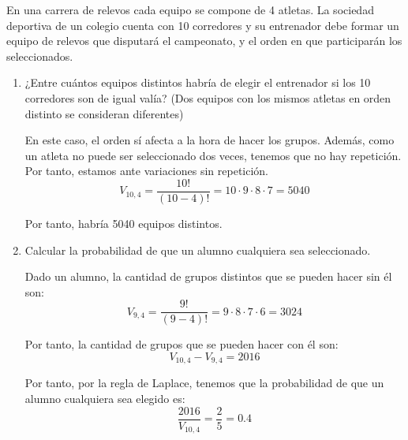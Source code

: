 \begin{ejercicio} \label{ej:3.Ejercicio8}
    En una carrera de relevos cada equipo se compone de 4 atletas. La sociedad deportiva de un colegio cuenta con 10 corredores y su entrenador debe formar un equipo de relevos que disputará el campeonato, y el orden en que participarán los seleccionados.
    \begin{enumerate}
        \item ¿Entre cuántos equipos distintos habría de elegir el entrenador si los 10 corredores son de igual valía? (Dos equipos con los mismos atletas en orden distinto se consideran diferentes)

        En este caso, el orden sí afecta a la hora de hacer los grupos. Además, como un atleta no puede ser seleccionado dos veces, tenemos que no hay repetición. Por tanto, estamos ante variaciones sin repetición.
        \begin{equation*}
            V_{10,4} = \frac{10!}{(10-4)!} = 10\cdot 9\cdot8 \cdot 7 = 5040
        \end{equation*}

        Por tanto, habría 5040 equipos distintos.
        
        \item Calcular la probabilidad de que un alumno cualquiera sea seleccionado.

        Dado un alumno, la cantidad de grupos distintos que se pueden hacer sin él son:
        \begin{equation*}
            V_{9,4} = \frac{9!}{(9-4)!} = 9\cdot8 \cdot 7\cdot 6 = 3024
        \end{equation*}

        Por tanto, la cantidad de grupos que se pueden hacer con él son:
        \begin{equation*}
            V_{10,4} - V_{9,4} = 2016
        \end{equation*}

        Por tanto, por la regla de Laplace, tenemos que la probabilidad de que un alumno cualquiera sea elegido es:
        \begin{equation*}
            \frac{2016}{V_{10,4}} = \frac{2}{5} = 0.4
        \end{equation*}
    \end{enumerate}
\end{ejercicio}

